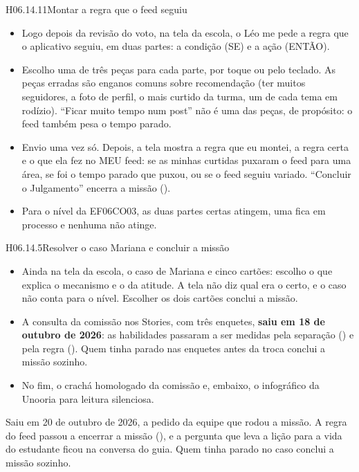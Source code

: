 \begin{historia}{H06.14.11}{Montar a regra que o feed seguiu}{\parcial}
\aceite
\begin{itemize}
  \item Logo depois da revisão do voto, na tela da escola, o Léo me pede a
    regra que o aplicativo seguiu, em duas partes: a condição (SE) e a ação
    (ENTÃO).
  \item Escolho uma de três peças para cada parte, por toque ou pelo teclado.
    As peças erradas são enganos comuns sobre recomendação (ter muitos
    seguidores, a foto de perfil, o mais curtido da turma, um de cada tema em
    rodízio). \enquote{Ficar muito tempo num post} não é uma das peças, de
    propósito: o feed também pesa o tempo parado.
  \item Envio uma vez só. Depois, a tela mostra a regra que eu montei, a
    regra certa e o que ela fez no MEU feed: se as minhas curtidas puxaram o
    feed para uma área, se foi o tempo parado que puxou, ou se o feed seguiu
    variado. \enquote{Concluir o Julgamento} encerra a missão
    ().
  \item Para o nível da EF06CO03, as duas partes certas atingem, uma fica em
    processo e nenhuma não atinge.
\end{itemize}
\end{historia}

\begin{historia}{H06.14.5}{Resolver o caso Mariana e concluir a missão}{\arquivada}
\aceite
\begin{itemize}
  \item Ainda na tela da escola, o caso de Mariana e cinco cartões: escolho o
    que explica o mecanismo e o da atitude. A tela não diz qual era o certo, e
    o caso não conta para o nível. Escolher os dois cartões conclui a missão.
  \item A consulta da comissão nos Stories, com três enquetes, \textbf{saiu em
    18 de outubro de 2026}: as habilidades passaram a ser medidas pela
    separação () e pela regra (). Quem tinha
    parado nas enquetes antes da troca conclui a missão sozinho.
  \item No fim, o crachá homologado da comissão e, embaixo, o infográfico da
    Unooria para leitura silenciosa.
\end{itemize}
Saiu em 20 de outubro de 2026, a pedido da equipe que rodou a missão. A regra do feed passou a
encerrar a missão (), e a pergunta que leva a lição para a vida
do estudante ficou na conversa do guia. Quem tinha parado no caso conclui a
missão sozinho.
\end{historia}

